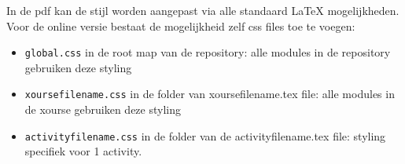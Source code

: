 \documentclass{ximera}
\begin{document}
In de pdf kan de stijl worden aangepast via alle standaard LaTeX mogelijkheden. Voor de online versie bestaat de mogelijkheid zelf css files toe te voegen:
	\begin{itemize}
		\item \verb|global.css| in de root map van de repository: alle modules in de repository gebruiken deze styling
		\item \verb|xoursefilename.css| in de folder van xoursefilename.tex file: alle modules in de xourse gebruiken deze styling
		\item \verb|activityfilename.css| in de folder van de activityfilename.tex file: styling specifiek voor 1 activity.
	\end{itemize}
\end{document}
